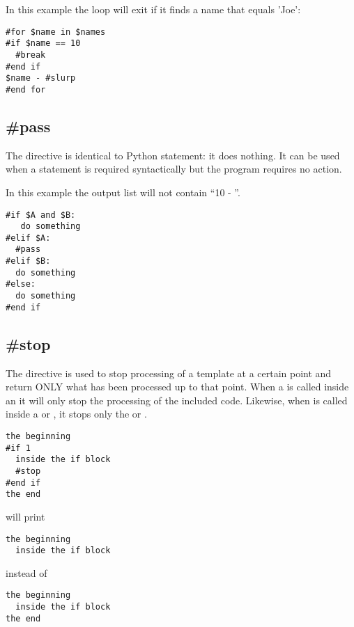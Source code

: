 In this example the loop will exit if it finds a name that equals 'Joe':
\begin{verbatim}
#for $name in $names
#if $name == 10
  #break
#end if
$name - #slurp
#end for
\end{verbatim}


\subsection{\#pass}
\label{flowControl.break}

The  directive is identical to Python  statement: it
does nothing. It can be used when a statement is required syntactically but the
program requires no action.

In this example the output list will not contain ``10 - ''. 
\begin{verbatim}
#if $A and $B:
   do something
#elif $A:
  #pass
#elif $B: 
  do something
#else:
  do something
#end if
\end{verbatim}

\subsection{\#stop}
\label{flowControl.stop}

The  directive is used to stop processing of a template at a
certain point and return ONLY what has been processed up to that point.  When a
 is called inside an  it will only stop the
processing of the included code.  Likewise, when  is called inside
a  or , it stops only the  or
.

\begin{verbatim}
the beginning
#if 1
  inside the if block
  #stop
#end if
the end
\end{verbatim}

will print 
\begin{verbatim}
the beginning
  inside the if block
\end{verbatim}

instead of 
\begin{verbatim}
the beginning
  inside the if block
the end
\end{verbatim}



